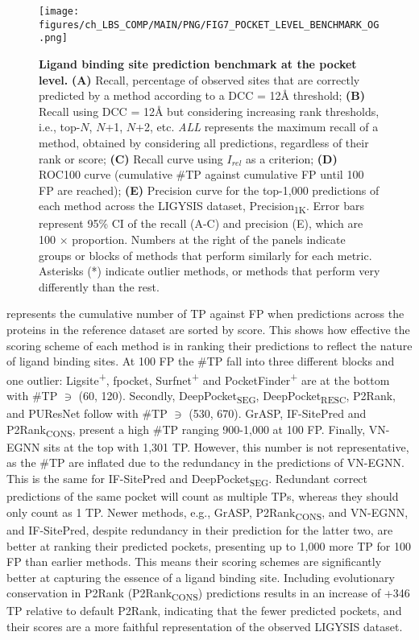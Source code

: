 \begin{figure}[ht!]
    \centering
    \texttt{[image: figures/ch\_LBS\_COMP/MAIN/PNG/FIG7\_POCKET\_LEVEL\_BENCHMARK\_OG.png]}
    \caption[Ligand binding site prediction benchmark at the pocket level]{\textbf{Ligand binding site prediction benchmark at the pocket level.} \textbf{(A)} Recall, percentage of observed sites that are correctly predicted by a method according to a DCC = 12\AA{} threshold; \textbf{(B)} Recall using DCC = 12\AA{} but considering increasing rank thresholds, i.e., top-$N$, $N$+1, $N$+2, etc. \textit{ALL} represents the maximum recall of a method, obtained by considering all predictions, regardless of their rank or score; \textbf{(C)} Recall curve using $I_{rel}$ as a criterion; \textbf{(D)} ROC100 curve  (cumulative \#TP against cumulative FP until 100 FP are reached); \textbf{(E)} Precision curve for the top-1,000 predictions of each method across the LIGYSIS dataset, Precision\textsubscript{1K}. Error bars represent 95\% CI of the recall (A-C) and precision (E), which are 100 $\times$ proportion. Numbers at the right of the panels indicate groups or blocks of methods that perform similarly for each metric. Asterisks (*) indicate outlier methods, or methods that perform very differently than the rest.}
    \label{fig:pocket_level_benchmark_OG}
\end{figure}

 represents the cumulative number of TP against FP when predictions across the proteins in the reference dataset are sorted by score. This shows how effective the scoring scheme of each method is in ranking their predictions to reflect the nature of ligand binding sites. At 100 FP the \#TP fall into three different blocks and one outlier: Ligsite\textsuperscript{+}, fpocket, Surfnet\textsuperscript{+} and PocketFinder\textsuperscript{+} are at the bottom with \#TP $\ni$ (60, 120). Secondly, DeepPocket\textsubscript{SEG}, DeepPocket\textsubscript{RESC}, P2Rank, and PUResNet follow with \#TP $\ni$ (530, 670). GrASP, IF-SitePred and P2Rank\textsubscript{CONS}, present a high \#TP ranging 900-1,000 at 100 FP. Finally, VN-EGNN sits at the top with 1,301 TP. However, this number is not representative, as the \#TP are inflated due to the redundancy in the predictions of VN-EGNN. This is the same for IF-SitePred and DeepPocket\textsubscript{SEG}. Redundant correct predictions of the same pocket will count as multiple TPs, whereas they should only count as 1 TP. Newer methods, e.g., GrASP, P2Rank\textsubscript{CONS}, and VN-EGNN, and IF-SitePred, despite redundancy in their prediction for the latter two, are better at ranking their predicted pockets, presenting up to 1,000 more TP for 100 FP than earlier methods. This means their scoring schemes are significantly better at capturing the essence of a ligand binding site. Including evolutionary conservation in P2Rank (P2Rank\textsubscript{CONS}) predictions results in an increase of +346 TP relative to default P2Rank, indicating that the fewer predicted pockets, and their scores are a more faithful representation of the observed LIGYSIS dataset.

